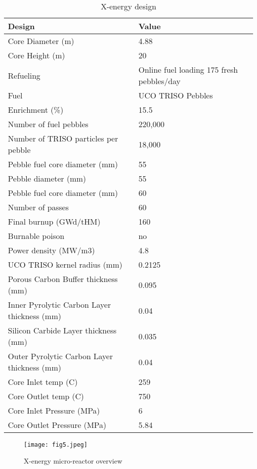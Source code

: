 \documentclass[10pt,a4paper]{article}
\begin{document}
\begin{table} [ht]
\begin{center}

\caption{ X-energy design}
\begin{tabular}{|l|l|}
\hline 
Design 		&Value \\ 
\hline 
Core Diameter (m) 		&4.88 \\ 
\hline 
Core Height (m) 		&20 \\ 
\hline 
Refueling		&Online fuel loading 
175 fresh pebbles/day \\ 
\hline 
Fuel		&UCO TRISO Pebbles \\ 
\hline 
Enrichment (\%)		&15.5 \\ 
\hline 
Number of fuel pebbles		&220,000 \\ 
\hline 
Number of TRISO particles per pebble		&18,000 \\ 
\hline 
Pebble fuel core diameter (mm)		&55 \\ 
\hline 
Pebble diameter (mm)	&55 \\ 
\hline 
Pebble fuel core diameter (mm)		&60 \\ 
\hline 
Number of passes		&60\\ 
\hline 
Final burnup (GWd/tHM)		&160 \\ 
\hline 
Burnable poison		&no \\ 
\hline 
Power density (MW/m3)		&4.8 \\ 
\hline 
UCO TRISO kernel radius (mm)	&0.2125 \\ 
\hline 
Porous Carbon Buffer thickness (mm)	&0.095 \\ 
\hline 
Inner Pyrolytic Carbon Layer thickness (mm) 	&0.04 \\ 
\hline 
Silicon Carbide Layer thickness (mm)	&0.035 \\ 
\hline 
Outer Pyrolytic Carbon Layer thickness (mm)	&0.04 \\ 
\hline 
Core Inlet temp (C)	&259 \\ 
\hline 
Core Outlet temp (C) 	&750 \\ 
\hline 
Core Inlet Pressure (MPa)	&6 \\ 
\hline 
Core Outlet Pressure (MPa)	&5.84 \\ 
\hline 

\end{tabular}
\end{center}
\end{table}

\begin{figure}[hbtp]
\centering
\texttt{[image: fig5.jpeg]}
\caption{X-energy micro-reactor overview}
\end{figure}
\end{document}

